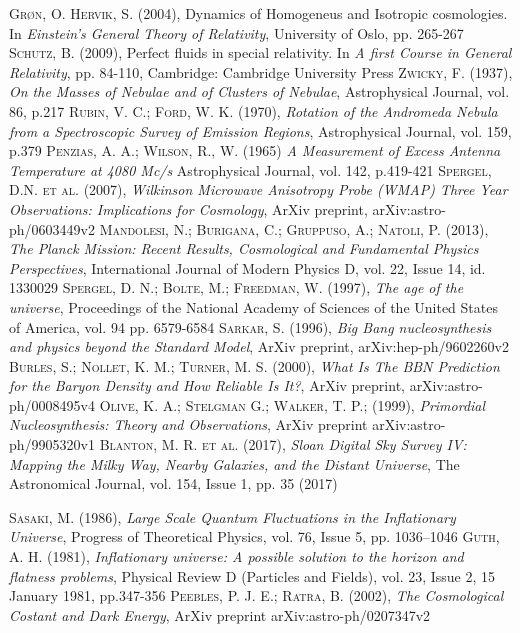 \documentclass[a4paper,openright,12pt]{book}
\begin{document}
\begin{thebibliography}{a}
 \textsc{ Grøn, O. Hervik, S. (2004)},
Dynamics of Homogeneus and Isotropic cosmologies. In
\textit{Einstein's General Theory of Relativity},
University of Oslo, pp. 265-267
 \textsc{Schutz, B. (2009)},
Perfect fluids in special relativity. In 
\textit{A first Course in General Relativity},
pp. 84-110, Cambridge: Cambridge University Press
 \textsc{Zwicky, F. (1937)},
\textit{On the Masses of Nebulae and of Clusters of Nebulae},
Astrophysical Journal, vol. 86, p.217
 \textsc{Rubin, V. C.; Ford, W. K. (1970)},
\textit{Rotation of the Andromeda Nebula from a Spectroscopic Survey of Emission Regions},
Astrophysical Journal, vol. 159, p.379 
 \textsc{Penzias, A. A.; Wilson, R., W. (1965)}
\textit{A Measurement of Excess Antenna Temperature at 4080 Mc/s}
Astrophysical Journal, vol. 142, p.419-421
 \textsc{Spergel, D.N. et al. (2007)},
\textit{Wilkinson Microwave Anisotropy Probe (WMAP) Three Year
Observations: Implications for Cosmology},
ArXiv preprint, arXiv:astro-ph/0603449v2
 \textsc{Mandolesi, N.; Burigana, C.; Gruppuso, A.; Natoli, P. (2013)},
\textit{The Planck Mission: Recent Results, Cosmological and Fundamental Physics Perspectives},
International Journal of Modern Physics D, vol. 22, Issue 14, id. 1330029
 \textsc{Spergel, D. N.; Bolte, M.; Freedman, W. (1997)},
\textit{The age of the universe},
Proceedings of the National Academy of Sciences of the United States of America, vol. 94 pp. 6579-6584
 \textsc{Sarkar, S. (1996)},
\textit{Big Bang nucleosynthesis and physics beyond the Standard Model},
ArXiv preprint, arXiv:hep-ph/9602260v2
 \textsc{Burles, S.; Nollet, K. M.; Turner, M. S. (2000)},
\textit{What Is The BBN Prediction for the Baryon Density and How Reliable Is It?},
ArXiv preprint, arXiv:astro-ph/0008495v4
 \textsc{Olive, K. A.; Stelgman G.; Walker, T. P.; (1999)},
\textit{Primordial Nucleosynthesis: Theory and Observations},
ArXiv preprint arXiv:astro-ph/9905320v1 
 \textsc{Blanton, M. R. et al. (2017)},
\textit{Sloan Digital Sky Survey IV: Mapping the Milky Way, Nearby Galaxies, and the Distant Universe},
The Astronomical Journal, vol. 154, Issue 1, pp. 35 (2017)

 \textsc{Sasaki, M. (1986)},
\textit{Large Scale Quantum Fluctuations in the Inflationary Universe},
Progress of Theoretical Physics, vol. 76, Issue 5, pp. 1036–1046
 \textsc{Guth, A. H. (1981)},
\textit{Inflationary universe: A possible solution to the horizon and flatness problems},
Physical Review D (Particles and Fields), vol. 23, Issue 2, 15 January 1981, pp.347-356
 \textsc{Peebles, P. J. E.; Ratra, B. (2002)},
\textit{The Cosmological Costant and Dark Energy},
ArXiv preprint arXiv:astro-ph/0207347v2


\end{thebibliography}
\end{document}
